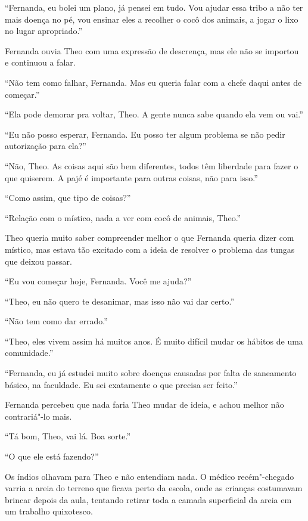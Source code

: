 ``Fernanda, eu bolei um plano, já pensei em tudo. Vou ajudar essa tribo
a não ter mais doença no pé, vou ensinar eles a recolher o cocô dos
animais, a jogar o lixo no lugar apropriado.''

Fernanda ouvia Theo com uma expressão de descrença, mas ele não se
importou e continuou a falar.

``Não tem como falhar, Fernanda. Mas eu queria falar com a chefe daqui
antes de começar.''

``Ela pode demorar pra voltar, Theo. A gente nunca sabe quando ela vem
ou vai.''

``Eu não posso esperar, Fernanda. Eu posso ter algum problema se não
pedir autorização para ela?''

``Não, Theo. As coisas aqui são bem diferentes, todos têm liberdade para
fazer o que quiserem. A pajé é importante para outras coisas, não para
isso.''

``Como assim, que tipo de coisas?''

``Relação com o místico, nada a ver com cocô de animais, Theo.''

Theo queria muito saber compreender melhor o que Fernanda queria dizer
com místico, mas estava tão excitado com a ideia de resolver o problema
das tungas que deixou passar.

``Eu vou começar hoje, Fernanda. Você me ajuda?''

``Theo, eu não quero te desanimar, mas isso não vai dar certo.''

``Não tem como dar errado.''

``Theo, eles vivem assim há muitos anos. É muito difícil mudar os
hábitos de uma comunidade.''

``Fernanda, eu já estudei muito sobre doenças causadas por falta de
saneamento básico, na faculdade. Eu sei exatamente o que precisa ser
feito.''

Fernanda percebeu que nada faria Theo mudar de ideia, e achou melhor não
contrariá"-lo mais.

``Tá bom, Theo, vai lá. Boa sorte.''

\asterisc


``O que ele está fazendo?''

Os índios olhavam para Theo e não entendiam nada. O médico recém"-chegado
varria a areia do terreno que ficava perto da escola, onde as
crianças costumavam brincar depois da aula, tentando retirar toda a
camada superficial da areia em um trabalho quixotesco.

